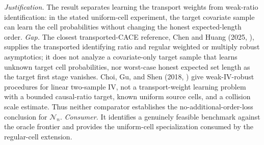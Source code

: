 \documentclass{article}
\begin{document}
\par\smallskip\noindent \textit{Justification.} The result separates learning the transport weights from weak-ratio identification: in the stated uniform-cell experiment, the target covariate sample can learn the cell probabilities without changing the honest expected-length order. \textit{Gap.} The closest transported-CACE reference, Chen and Huang (2025, \cite{ChenHuang2025}), supplies the transported identifying ratio and regular weighted or multiply robust asymptotics; it does not analyze a covariate-only target sample that learns unknown target cell probabilities, nor worst-case honest expected set length as the target first stage vanishes. Choi, Gu, and Shen (2018, \cite{ChoiGuShen2018}) give weak-IV-robust procedures for linear two-sample IV, not a transport-weight learning problem with a bounded causal-ratio target, known uniform source cells, and a collision scale estimate. Thus neither comparator establishes the no-additional-order-loss conclusion for \(\mathcal N_n\). \textit{Consumer.} It identifies a genuinely feasible benchmark against the oracle frontier and provides the uniform-cell specialization consumed by the regular-cell extension.
\end{document}
